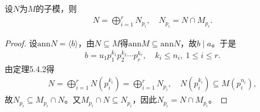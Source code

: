 \documentclass[../../main.tex]{subfiles}%
\begin{document}
\begin{corollary}
设$N$为$M$的子模，则
\begin{align*}
N=\bigoplus\limits_{i=1}^{r}N_{p_i},\quad N_{p_i}=N\cap M_{p_i}.
\end{align*}
\end{corollary}
\begin{proof}
设$\mathrm{ann}N=\langle b\rangle$，由$N\subseteq M$得$\mathrm{ann}M\subseteq\mathrm{ann}N$，故$b\mid a$。于是
\begin{align*}
b=u_1p_1^{k_1}p_2^{k_2}\cdots p_r^{k_r},\quad k_i\leqslant n_i,\ 1\leqslant i\leqslant r.
\end{align*}
由定理5.4.2得
\begin{align*}
N=\bigoplus\limits_{i=1}^{r}N(p_i^{k_i})=\bigoplus\limits_{i=1}^{r}N_{p_i},\quad N(p_i^{k_i})\subseteq M(p_i^{n_i}),
\end{align*}
故$N_{p_i}\subseteq M_{p_i}\cap N$。又$M_{p_i}\cap N\subseteq N_{p_i}$，因此$N_{p_i}=N\cap M_{p_i}$。
\end{proof}
\end{document}
